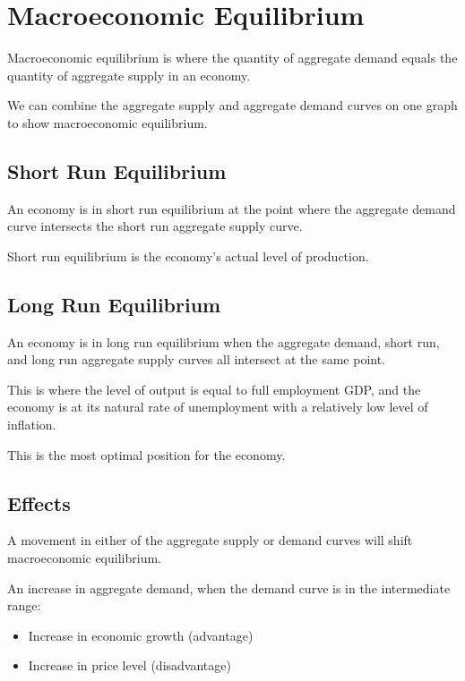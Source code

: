 \documentclass[a4paper,11pt]{article}
\begin{document}
\section{Macroeconomic Equilibrium}

Macroeconomic equilibrium is where the quantity of aggregate demand equals the
quantity of aggregate supply in an economy.

We can combine the aggregate supply and aggregate demand curves on one graph to
show macroeconomic equilibrium.


\subsection{Short Run Equilibrium}


An economy is in short run equilibrium at the point where the aggregate demand
curve intersects the short run aggregate supply curve.

Short run equilibrium is the economy's actual level of production.


\subsection{Long Run Equilibrium}


An economy is in long run equilibrium when the aggregate demand, short
run, and long run aggregate supply curves all intersect at the same point.

This is where the level of output is equal to full employment GDP, and the
economy is at its natural rate of unemployment with a relatively low level of
inflation.

This is the most optimal position for the economy.


\subsection{Effects}

A movement in either of the aggregate supply or demand curves will shift
macroeconomic equilibrium.

An increase in aggregate demand, when the demand curve is in the intermediate
range:

\begin{itemize}
\item Increase in economic growth (advantage)
\item Increase in price level (disadvantage)
\end{itemize}
\end{document}

